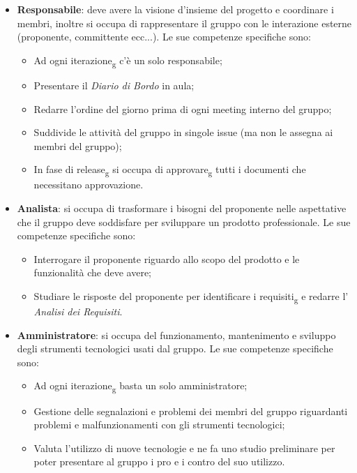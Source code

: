 \begin{itemize}
\item \textbf{Responsabile}: deve avere la visione d'insieme del progetto e coordinare i membri, inoltre si occupa di rappresentare il gruppo con le interazione esterne (proponente, committente ecc...). Le sue competenze specifiche sono:
\begin{itemize}
	\item Ad ogni iterazione\textsubscript{g} c'è un solo responsabile;
	\item Presentare il \textit{Diario di Bordo} in aula;
	\item Redarre l'ordine del giorno prima di ogni meeting interno del gruppo;
	\item Suddivide le attività del gruppo in singole issue (ma non le assegna ai membri del gruppo);
	\item In fase di release\textsubscript{g} si occupa di approvare\textsubscript{g} tutti i documenti che necessitano approvazione.
\end{itemize}

\item \textbf{Analista}: si occupa di trasformare i bisogni del proponente nelle aspettative che il gruppo deve soddisfare per sviluppare un prodotto professionale. Le sue competenze specifiche sono:
\begin{itemize}
	\item Interrogare il proponente riguardo allo scopo del prodotto e le funzionalità che deve avere;
	\item Studiare le risposte del proponente per identificare i requisiti\textsubscript{g} e redarre l' \textit{Analisi dei Requisiti}.
\end{itemize}

\item \textbf{Amministratore}: si occupa del funzionamento, mantenimento e sviluppo degli strumenti tecnologici usati dal gruppo. Le sue competenze specifiche sono:
\begin{itemize}
	\item Ad ogni iterazione\textsubscript{g} basta un solo amministratore;
	\item Gestione delle segnalazioni e problemi dei membri del gruppo riguardanti problemi e malfunzionamenti con gli strumenti tecnologici;
	\item Valuta l'utilizzo di nuove tecnologie e ne fa uno studio preliminare per poter presentare al gruppo i pro e i contro del suo utilizzo.
\end{itemize}


\end{itemize}
